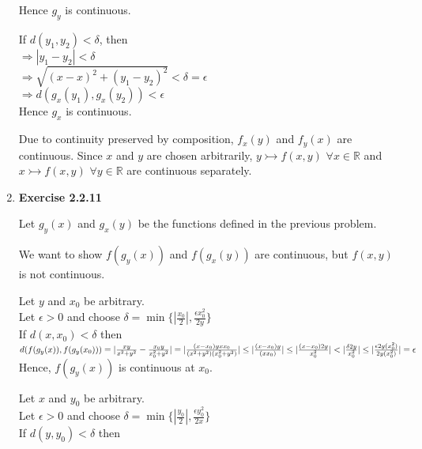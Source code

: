 \documentclass[10pt]{article}
\begin{document}
\begin{enumerate}[label=Problem \arabic*.]
\begin{minipage}{0.5\textwidth}
            Hence $g_{y}$ is continuous. 
        \end{minipage}
        \begin{minipage}{0.5\textwidth}
            If $d(y_1,y_2)<\delta$, then\\ 
            $\Rightarrow |y_1-y_2|<\delta$\\
            $\Rightarrow \sqrt{(x-x)^2+(y_1-y_2)^2}<\delta=\epsilon$\\
            $\Rightarrow d(g_{x}(y_1),g_{x}(y_2))<\epsilon$\\
            Hence $g_{x}$ is continuous. 
        \end{minipage}
        Due to continuity preserved by composition, $f_x(y)$ and $f_y(x)$ are continuous. 
        Since $x$ and $y$ are chosen arbitrarily, $y\rightarrowtail f(x,y)$ $\forall x\in \mathbb{R}$ and $x\rightarrowtail f(x,y)$ $\forall y\in \mathbb{R}$ are continuous separately. 
    \item \textbf{Exercise 2.2.11}\par
        Let $g_y(x)$ and $g_x(y)$ be the functions defined in the previous problem.\par 
        We want to show $f(g_y(x))$ and $f(g_x(y))$ are continuous, but $f(x,y)$ is not continuous.\par
        \begin{minipage}{0.5\textwidth}
            Let $y$ and $x_0$ be arbitrary.\\
            Let $\epsilon>0$ and choose $\delta=\min\{|\frac{x_0}{2}|,\frac{\epsilon x_{0}^2}{2y}\}$\\ 
            If $d(x,x_0)<\delta$ then\\
            $d(f(g_y(x)),f(g_y(x_0)))=|\frac{xy}{x^2+y^2}-\frac{x_0y}{x_{0}^{2}+y^2}|\\
            =|\frac{(x-x_0)yxx_0}{(x^2+y^2)(x_{0}^{2}+y^2)}|\le |\frac{(x-x_0)y}{(xx_{0})}|\\
            \le |\frac{(x-x_0)2y}{x_{0}^{2}}|<|\frac{\delta2y}{x_{0}^{2}}|\le|\frac{\epsilon2y(x_{0}^{2})}{2y(x_{0}^{2})}|=\epsilon$\\
            Hence, $f(g_y(x))$ is continuous at $x_0$.  
        \end{minipage}
        \begin{minipage}{0.5\textwidth}
            Let $x$ and $y_0$ be arbitrary.\\
            Let $\epsilon>0$ and choose $\delta=\min\{|\frac{y_0}{2}|,\frac{\epsilon y_{0}^2}{2x}\}$\\ 
            If $d(y,y_0)<\delta$ then\\

\end{minipage}
\end{enumerate}
\end{document}
